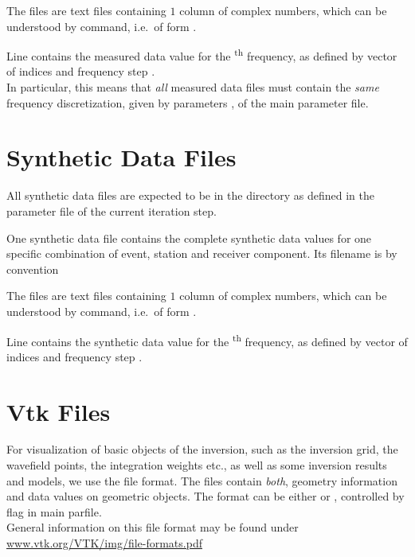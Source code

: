 The files are text files containing $1$ column of  complex numbers, 
which can be understood by   command, i.e.\ of form  .

Line  contains the measured data value for the \textsuperscript{th} frequency, as defined by vector
of indices  and frequency step . \\
In particular, this means that \emph{all} measured data files must contain the \emph{same} frequency discretization, given
by parameters ,  of the main 
parameter file.
%
\section{Synthetic Data Files} \label{files,sec:synth_data} 
%
All synthetic data files are expected to be in the directory  as defined 
in the parameter file of the current iteration step.

One synthetic data file contains the complete synthetic data values for one specific combination of
event, station and receiver component. Its filename is by convention 

The files are text files containing $1$ column of   
complex numbers, which can be understood by   command, i.e.\ of form  .

Line  contains the synthetic data value for the \textsuperscript{th} frequency, as defined by vector
of indices  and frequency step .
%
\section{Vtk Files} \label{files,sec:vtk_files}
%
For visualization of basic objects of the inversion, such as the inversion grid, 
the wavefield points, the integration weights etc., as well as some inversion results
and models, we use the  file format. The files contain \emph{both}, geometry
information and data values on geometric objects. The format can be either  or 
, controlled by flag  in main parfile.\\
General information on this file format may be found under \url{www.vtk.org/VTK/img/file-formats.pdf}


